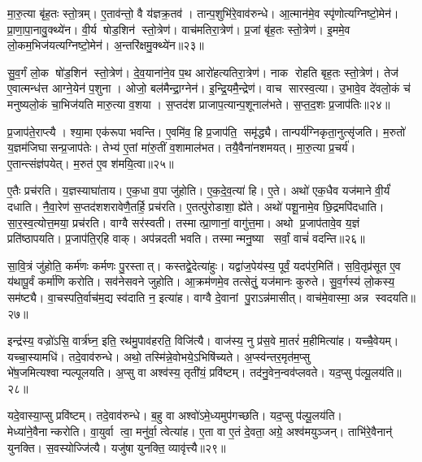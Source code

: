 मा॒रु॒त्या बृ॑ह॒तः स्तो॒त्रम्।
ए॒ताव॑न्तो॒ वै य॑ज्ञक्र॒तव॑।
तान्प॒शुभि॑रे॒वाव॑रुन्धे।
आ॒त्मान॑मे॒व स्पृ॑णोत्यग्निष्टो॒मेन॑।
प्रा॒णा॒पा॒नावु॒क्थ्ये॑न।
वी॒र्य षोड॒शिन॑ स्तो॒त्रेण॑।
वाच॑मतिरा॒त्रेण॑।
प्र॒जां बृ॑ह॒तः स्तो॒त्रेण॑।
इ॒ममे॒व लो॒कम॒भिज॑यत्यग्निष्टो॒मेन॑।
अ॒न्तरि॑क्षमु॒क्थ्ये॑न॥२३॥

सु॒व॒र्गं लो॒क षो॑ड॒शिन॑ स्तो॒त्रेण॑।
दे॒व॒याना॑ने॒व प॒थ आरो॑हत्यतिरा॒त्रेण॑।
नाक रोहति बृह॒तः स्तो॒त्रेण॑।
तेज॑ ए॒वात्मन्ध॑त्त आग्ने॒येन॑ प॒शुना।
ओजो॒ बल॑मैन्द्रा॒ग्नेन॑।
इ॒न्द्रि॒यमै॒न्द्रेण॑।
वाच सारस्व॒त्या।
उ॒भावे॒व दे॑वलो॒कं च॑ मनुष्यलो॒कं चा॒भिज॑यति मारु॒त्या व॒शया।
स॒प्तद॑श प्राजाप॒त्यान्प॒शूनाल॑भते।
स॒प्त॒द॒शः प्र॒जाप॑तिः॥२४॥

प्र॒जाप॑ते॒राप्त्यै।
श्या॒मा एक॑रूपा भवन्ति।
ए॒वमि॑व॒ हि प्र॒जाप॑ति॒ समृ॑द्ध्यै।
तान्पर्य॑ग्निकृता॒नुत्सृ॑जति।
म॒रुतो॑ य॒ज्ञम॑जिघासन्प्र॒जाप॑तेः।
तेभ्य॑ ए॒तां मा॑रु॒तीं व॒शामाल॑भत।
तयै॒वैना॑नशमयत्।
मा॒रु॒त्या प्र॒चर्य॑।
ए॒तान्त्संज्ञ॑पयेत्।
म॒रुत॑ ए॒व श॑मयि॒त्वा॥२५॥

ए॒तैः प्रच॑रति।
य॒ज्ञस्याघा॑ताय।
ए॒क॒धा व॒पा जु॑होति।
ए॒क॒दे॒व॒त्या॑ हि।
ए॒ते।
अथो॑ एक॒धैव यज॑माने वी॒र्यं॑ दधाति।
नै॒वा॒रेण॑ स॒प्तद॑शशरावेणै॒तर्\mbox{}हि॒ प्रच॑रति।
ए॒तत्पु॑रोडाशा॒ ह्ये॑ते।
अथो॑ पशू॒नामे॒व छि॒द्रमपि॑दधाति।
सा॒र॒स्व॒त्योत्त॒मया॒ प्रच॑रति।
वाग्वै सर॑स्वती।
तस्मात्प्रा॒णानां॒ वागु॑त्त॒मा।
अथो प्र॒जाप॑तावे॒व य॒ज्ञं प्रति॑ष्ठापयति।
प्र॒जाप॑ति॒र्‌हि वाक्।
अप॑न्नदती भवति।
तस्मान्मनु॒ष्या सर्वां॒ वाचं॑ वदन्ति॥२६॥\anuvakamend[अ॒ति॒रा॒त्रम॒न्तरि॑क्षमु॒क्थ्ये॑न प्र॒जाप॑तिः शमयि॒त्वोत्त॒मया॒ प्रच॑रति॒ षट् च॑]

सा॒वि॒त्रं जु॑होति॒ कर्म॑णः कर्मणः पु॒रस्तात्।
कस्तद्वे॒देत्या॑हुः।
यद्वा॑ज॒पेय॑स्य॒ पूर्वं॒ यदप॑र॒मिति॑।
स॒वि॒तृप्र॑सूत ए॒व य॑थापू॒र्वं कर्मा॑णि करोति।
सव॑नेसवने जुहोति।
आ॒क्रम॑णमे॒व तत्सेतुं॒ यज॑मानः कुरुते।
सु॒व॒र्गस्य॑ लो॒कस्य॒ सम॑ष्ट्यै।
वा॒चस्पति॒र्वाच॑म॒द्य स्व॑दाति न॒ इत्या॑ह।
वाग्वै दे॒वानां पु॒राऽन्न॑मासीत्।
वाच॑मे॒वास्मा॒ अन्न स्वदयति॥२७॥

इन्द्र॑स्य॒ वज्रो॑ऽसि॒ वार्त्र॑घ्न॒ इति॒ रथ॑मु॒पाव॑हरति॒ विजि॑त्यै।
वाज॑स्य॒ नु प्र॑स॒वे मा॒तरं॑ म॒हीमित्या॑ह।
यच्चै॒वेयम्।
यच्चा॒स्यामधि॑।
तदे॒वाव॑रुन्धे।
अथो॒ तस्मि॑न्ने॒वोभये॒ऽभिषि॑च्यते।
अ॒प्स्व॑न्तर॒मृत॑म॒प्सु भे॑ष॒जमित्यश्वान्पल्पूलयति।
अ॒प्सु वा अश्व॑स्य॒ तृती॑यं॒ प्रवि॑ष्टम्।
तद॑नु॒वेन॒न्वव॑प्लवते।
यद॒प्सु प॑ल्पू॒लय॑ति॥२८॥

यदे॒वास्या॒प्सु प्रवि॑ष्टम्।
तदे॒वाव॑रुन्धे।
ब॒हु वा अश्वो॑ऽमे॒ध्यमुप॑गच्छति।
यद॒प्सु प॑ल्पू॒लय॑ति।
मेध्या॑ने॒वै\-नान्करोति।
वा॒युर्वा त्वा॒ मनु॑र्वा॒ त्वेत्या॑ह।
ए॒ता वा ए॒तं दे॒वता॒ अग्रे॒ अश्व॑मयुञ्जन्।
ताभि॑रे॒वैनान्॑ युनक्ति।
स॒वस्योज्जि॑त्यै।
यजु॑षा युनक्ति॒ व्यावृ॑त्त्यै॥२९॥

